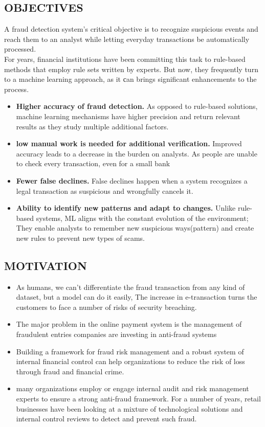 \documentclass[12pt]{article}
\begin{document}
\subsection{OBJECTIVES}
A fraud detection system's critical objective is to recognize suspicious events and reach them to an analyst while letting everyday transactions be automatically processed.\\
For years, financial institutions have been committing this task to rule-based methods that employ rule sets written by experts. But now, they frequently turn to a machine learning approach, as it сan brings significant enhancements to the process.
\begin{itemize}
    \item \textbf{ Higher accuracy of fraud detection.} As opposed to rule-based solutions, machine learning mechanisms have higher precision and return relevant results as they study multiple additional factors.
   \item \textbf{low manual work is needed for additional verification.} Improved accuracy leads to a decrease in the burden on analysts. As people are unable to check every transaction, even for a small bank 
   \item \textbf{Fewer false declines.} False declines happen when a system recognizes a legal transaction as suspicious and wrongfully cancels it.
   \item  \textbf{Ability to identify new patterns and adapt to changes. }Unlike rule-based systems, ML aligns with the constant evolution of the environment; They enable analysts to remember new suspicious ways(pattern) and create new rules to prevent new types of scams.

\end{itemize}

\subsection{MOTIVATION}
\begin{itemize}
    \item As humans, we can’t differentiate the fraud transaction from any kind of dataset, but a model can do it easily,
The increase in e-transaction turns the customers to face a number of risks of security breaching. 
\item The major problem in the online payment system is the management of fraudulent entries companies are investing in anti-fraud systems
\item Building a framework for fraud risk management and a robust system of internal financial control can help organizations to reduce the risk of loss through fraud and financial crime.
\item many organizations employ or engage internal audit and risk management experts to ensure a strong anti-fraud framework. For a number of years, retail businesses have been looking at a mixture of technological solutions and internal control reviews to detect and prevent such fraud.
\end{itemize}
\end{document}
